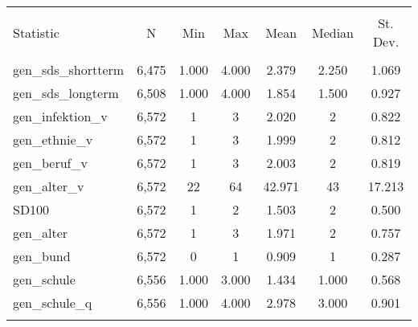 
\begin{table}[!htbp] \centering 
  \caption{} 
  \label{} 
\begin{tabular}{@{\extracolsep{5pt}}lcccccc} 
\\[-1.8ex]\hline 
\hline \\[-1.8ex] 
Statistic & \multicolumn{1}{c}{N} & \multicolumn{1}{c}{Min} & \multicolumn{1}{c}{Max} & \multicolumn{1}{c}{Mean} & \multicolumn{1}{c}{Median} & \multicolumn{1}{c}{St. Dev.} \\ 
\hline \\[-1.8ex] 
gen\_sds\_shortterm & 6,475 & 1.000 & 4.000 & 2.379 & 2.250 & 1.069 \\ 
gen\_sds\_longterm & 6,508 & 1.000 & 4.000 & 1.854 & 1.500 & 0.927 \\ 
gen\_infektion\_v & 6,572 & 1 & 3 & 2.020 & 2 & 0.822 \\ 
gen\_ethnie\_v & 6,572 & 1 & 3 & 1.999 & 2 & 0.812 \\ 
gen\_beruf\_v & 6,572 & 1 & 3 & 2.003 & 2 & 0.819 \\ 
gen\_alter\_v & 6,572 & 22 & 64 & 42.971 & 43 & 17.213 \\ 
SD100 & 6,572 & 1 & 2 & 1.503 & 2 & 0.500 \\ 
gen\_alter & 6,572 & 1 & 3 & 1.971 & 2 & 0.757 \\ 
gen\_bund & 6,572 & 0 & 1 & 0.909 & 1 & 0.287 \\ 
gen\_schule & 6,556 & 1.000 & 3.000 & 1.434 & 1.000 & 0.568 \\ 
gen\_schule\_q & 6,556 & 1.000 & 4.000 & 2.978 & 3.000 & 0.901 \\ 
\hline \\[-1.8ex] 
\end{tabular} 
\end{table} 
